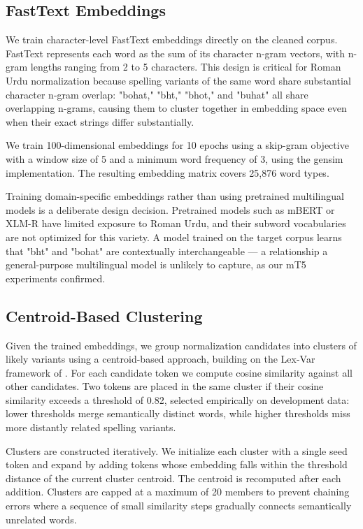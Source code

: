 \documentclass[11pt]{article}
\begin{document}
\subsection{FastText Embeddings}
We train character-level FastText embeddings \citep{bojanowski2017enriching} directly on the cleaned corpus. FastText represents each word as the sum of its character n-gram vectors, with n-gram lengths ranging from 2 to 5 characters. This design is critical for Roman Urdu normalization because spelling variants of the same word share substantial character n-gram overlap: "bohat," "bht," "bhot," and "buhat" all share overlapping n-grams, causing them to cluster together in embedding space even when their exact strings differ substantially.

We train 100-dimensional embeddings for 10 epochs using a skip-gram objective with a window size of 5 and a minimum word frequency of 3, using the gensim implementation. The resulting embedding matrix covers 25,876 word types.

Training domain-specific embeddings rather than using pretrained multilingual models is a deliberate design decision. Pretrained models such as mBERT or XLM-R have limited exposure to Roman Urdu, and their subword vocabularies are not optimized for this variety. A model trained on the target corpus learns that "bht" and "bohat" are contextually interchangeable — a relationship a general-purpose multilingual model is unlikely to capture, as our mT5 experiments confirmed.


\subsection{Centroid-Based Clustering}
Given the trained embeddings, we group normalization candidates into clusters of likely variants using a centroid-based approach, building on the Lex-Var framework of \citet{khan2019clustering}. For each candidate token we compute cosine similarity against all other candidates. Two tokens are placed in the same cluster if their cosine similarity exceeds a threshold of 0.82, selected empirically on development data: lower thresholds merge semantically distinct words, while higher thresholds miss more distantly related spelling variants.

Clusters are constructed iteratively. We initialize each cluster with a single seed token and expand by adding tokens whose embedding falls within the threshold distance of the current cluster centroid. The centroid is recomputed after each addition. Clusters are capped at a maximum of 20 members to prevent chaining errors where a sequence of small similarity steps gradually connects semantically unrelated words.
\end{document}
